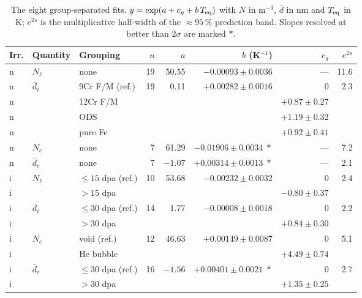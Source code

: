 \begin{table}[htbp]
\centering\small
\caption{The eight group-separated fits. $y = \exp(a + c_g + b\,T_{\rm eq})$ with
$N$ in m$^{-3}$, $\bar d$ in nm and $T_{\rm eq}$ in K; $e^{2s}$ is the
multiplicative half-width of the $\approx\!95\,\%$ prediction band. Slopes
resolved at better than $2\sigma$ are marked $\ast$.}
\label{tab:summary}
\begin{tabular}{lllrrrrr}
\toprule
Irr. & Quantity & Grouping & $n$ & $a$ & $b$ (K$^{-1}$) & $c_g$ & $e^{2s}$ \\
\midrule
n & $N_{\ell}$    & none                & 19 & 50.55 & $-0.00093 \pm 0.0036$        & ---   & 11.6 \\
n & $\bar d_\ell$ & 9Cr F/M (ref.)      & 19 &  0.11 & $+0.00282 \pm 0.0016$        & $0$   & 2.3 \\
n &               & \quad 12Cr F/M      &    &       &                              & $+0.87 \pm 0.27$ & \\
n &               & \quad ODS           &    &       &                              & $+1.19 \pm 0.32$ & \\
n &               & \quad pure Fe       &    &       &                              & $+0.92 \pm 0.41$ & \\
n & $N_c$         & none                &  7 & 61.29 & $-0.01906 \pm 0.0034\;\ast$  & ---   & 7.2 \\
n & $\bar d_c$    & none                &  7 & $-1.07$ & $+0.00314 \pm 0.0013\;\ast$& ---   & 2.1 \\
\midrule
i & $N_{\ell}$    & $\leq 15$ dpa (ref.)& 10 & 53.68 & $-0.00232 \pm 0.0032$        & $0$   & 2.4 \\
i &               & \quad $>15$ dpa     &    &       &                              & $-0.80 \pm 0.37$ & \\
i & $\bar d_\ell$ & $\leq 30$ dpa (ref.)& 14 &  1.77 & $-0.00008 \pm 0.0018$        & $0$   & 2.2 \\
i &               & \quad $>30$ dpa     &    &       &                              & $+0.84 \pm 0.30$ & \\
i & $N_c$         & void (ref.)         & 12 & 46.63 & $+0.00149 \pm 0.0087$        & $0$   & 5.1 \\
i &               & \quad He bubble     &    &       &                              & $+4.49 \pm 0.74$ & \\
i & $\bar d_c$    & $\leq 30$ dpa (ref.)& 16 & $-1.56$ & $+0.00401 \pm 0.0021\;\ast$& $0$   & 2.7 \\
i &               & \quad $>30$ dpa     &    &       &                              & $+1.35 \pm 0.25$ & \\
\bottomrule
\end{tabular}
\end{table}
